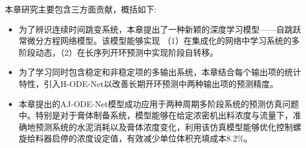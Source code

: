 本章研究主要包含三方面贡献，概括如下:
\begin{itemize}
    \item 为了辨识连续时间跳变系统，本章提出了一种新颖的深度学习模型——自跳跃常微分方程网络模型。该模型能够实现
    （1）在集成化的网络中学习系统的多阶段动态，（2）在长序列开环预测中实现阶段自转移。
    \item 为了学习同时包含稳定和非稳定项的多输出系统，本章结合每个输出项的统计特性，引入H-ODE-Net以改善长期开环预测中两种输出项的预测精度。
    \item 本章提出的AJ-ODE-Net模型成功应用于两种周期多阶段系统的预测仿真问题中。特别是对于膏体制备系统，模型能够在给定浓密机出料浓度与流量下，准确地预测系统的水泥消耗以及膏体浓度变化，利用该仿真模型能够优化控制螺旋给料器启停的浓度设定值，有效减少单位体积充填成本8.2\%。
\end{itemize}

